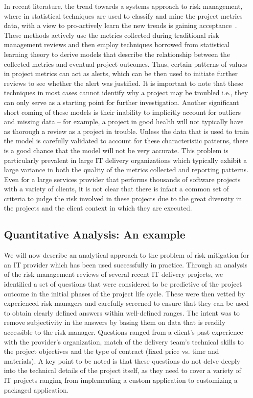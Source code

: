 In recent literature, the trend towards a systems approach to risk management, where in statistical techniques are used to classify and mine the project metrics data, with a view to pro-actively learn the new trends is gaining acceptance~\cite{risk8,risk9,risk10}.  These methods actively use the metrics collected during traditional risk management reviews and then employ techniques borrowed from statistical learning theory to derive models that describe the relationship between the collected metrics and eventual project outcomes. Thus, certain patterns of values in project metrics can act as alerts, which can be then used to initiate further reviews to see whether the alert was justified. It is important to note that these techniques in most cases cannot identify why a project may be troubled i.e., they can only serve as a starting point for further investigation.  Another significant short coming of these models is their inability to implicitly account for outliers and missing data -- for example, a project in good health will not typically have as thorough a review as a project in trouble. Unless the data that is used to train the model is carefully validated to account for these characteristic patterns, there is a good chance that the model will not be very accurate. This problem is particularly prevalent in large IT delivery organizations which typically exhibit a large variance in both the quality of the metrics collected and reporting patterns. Even for a large services provider that performs thousands of software projects with a variety of clients, it is not clear that there is infact a common set of criteria to judge the risk involved in these projects due to the great diversity in the projects and the client context in which they are executed.

\subsection{Quantitative Analysis: An example}

We will now describe an analytical approach to the problem of risk mitigation for an IT provider which has been used successfully in practice. Through an analysis of the risk management reviews of several recent IT delivery projects, we identified a set of questions that were considered to be predictive of the project outcome in the initial phases of the project life cycle. These were then vetted by experienced risk managers and carefully screened to ensure that they can be used to obtain clearly defined answers within well-defined ranges. The intent was to remove subjectivity in the answers by basing them on data that is readily accessible to the risk manager.  Questions ranged from a client's past experience with the provider's organization, match of the delivery team's technical skills to the project objectives and the type of contract (fixed price vs. time and materials).  A key point to be noted is that these questions do not delve deeply into the technical details of the project itself, as they need to cover a variety of IT projects ranging from implementing a custom application to customizing a packaged application.


